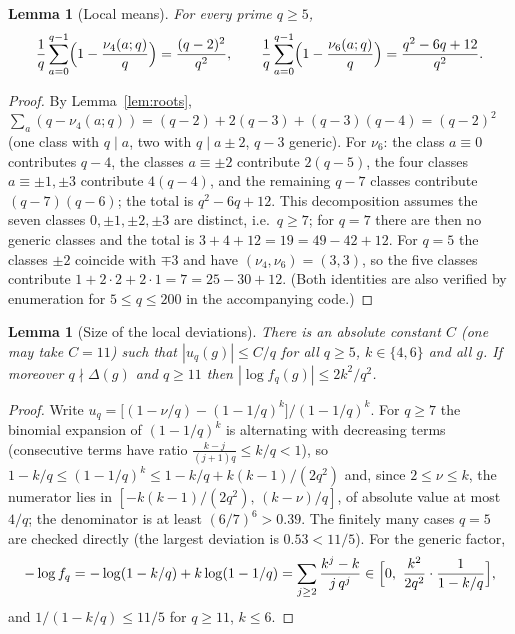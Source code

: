 \documentclass[11pt,a4paper]{article}
\theoremstyle{plain}
\newtheorem{lemma}[theorem]{Lemma}
\theoremstyle{definition}
\theoremstyle{remark}
\begin{document}
\begin{lemma}[Local means]\label{lem:localmean}
For every prime $q\ge5$,
\[
\frac1q\sum_{a=0}^{q-1}\Bigl(1-\frac{\nu_4(a;q)}q\Bigr)=\frac{(q-2)^2}{q^2},
\qquad
\frac1q\sum_{a=0}^{q-1}\Bigl(1-\frac{\nu_6(a;q)}q\Bigr)=\frac{q^2-6q+12}{q^2}.
\]
\end{lemma}
\begin{proof}
By Lemma~\ref{lem:roots}, $\sum_a(q-\nu_4(a;q))=(q-2)+2(q-3)+(q-3)(q-4)=(q-2)^2$
(one class with $q\mid a$, two with $q\mid a\pm2$, $q-3$ generic).  For
$\nu_6$: the class $a\equiv0$ contributes $q-4$, the classes $a\equiv\pm2$
contribute $2(q-5)$, the four classes $a\equiv\pm1,\pm3$ contribute
$4(q-4)$, and the remaining $q-7$ classes contribute $(q-7)(q-6)$; the total
is $q^2-6q+12$.  This decomposition assumes the seven classes
$0,\pm1,\pm2,\pm3$ are distinct, i.e.\ $q\ge7$; for $q=7$ there are then no
generic classes and the total is $3+4+12=19=49-42+12$.  For $q=5$ the
classes $\pm2$ coincide with $\mp3$ and have $(\nu_4,\nu_6)=(3,3)$, so the
five classes contribute $1+2\cdot2+2\cdot1=7=25-30+12$.  (Both identities
are also verified by enumeration for $5\le q\le 200$ in the accompanying
code.)
\end{proof}

\begin{lemma}[Size of the local deviations]\label{lem:size}
There is an absolute constant $C$ (one may take $C=11$) such that
$|u_q(g)|\le C/q$ for all $q\ge5$, $k\in\{4,6\}$ and all $g$.  If moreover
$q\nmid\Delta(g)$ and $q\ge11$ then $|\log f_q(g)|\le 2k^2/q^2$.
\end{lemma}
\begin{proof}
Write $u_q=\bigl[(1-\nu/q)-(1-1/q)^k\bigr]/(1-1/q)^k$.  For $q\ge7$ the
binomial expansion of $(1-1/q)^k$ is alternating with decreasing terms
(consecutive terms have ratio $\frac{k-j}{(j+1)q}\le k/q<1$), so
$1-k/q\le(1-1/q)^k\le1-k/q+k(k-1)/(2q^2)$ and, since $2\le\nu\le k$, the
numerator lies in $[-k(k-1)/(2q^2),\,(k-\nu)/q]$, of absolute value at most
$4/q$; the denominator is at least $(6/7)^6>0.39$.  The finitely many cases
$q=5$ are checked directly (the largest deviation is $0.53<11/5$).  For the
generic factor,
\[
-\log f_q=-\log(1-k/q)+k\log(1-1/q)=\sum_{j\ge2}\frac{k^j-k}{j\,q^j}
\in\Bigl[0,\ \frac{k^2}{2q^2}\cdot\frac1{1-k/q}\Bigr],
\]
and $1/(1-k/q)\le 11/5$ for $q\ge11$, $k\le6$.
\end{proof}
\end{document}
